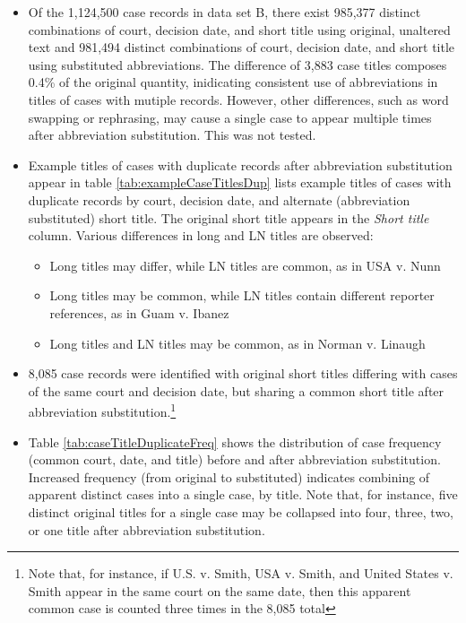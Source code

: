 \documentclass[10pt, letterpaper]{article}
\begin{document}
\begin{spacing}{1.0}
\begin{itemize}\setlength\itemsep{1pt}
    \item Of the 1,124,500 case records in data set B, there exist 985,377 distinct combinations of court, decision date, and short title using original, unaltered text and 981,494 distinct combinations of court, decision date, and short title using substituted abbreviations.  The difference of 3,883 case titles composes 0.4\% of the original quantity, inidicating consistent use of abbreviations in titles of cases with mutiple records.  However, other differences, such as word swapping or rephrasing, may cause a single case to appear multiple times after abbreviation substitution.  This was not tested.
    \item Example titles of cases with duplicate records after abbreviation substitution appear in table \ref{tab:exampleCaseTitlesDup} lists example titles of cases with duplicate records by court, decision date, and alternate (abbreviation substituted) short title.  The original short title appears in the \textit{Short title} column.  Various differences in long and LN titles are observed:
    \begin{itemize}[noitemsep]
        \item Long titles may differ, while LN titles are common, as in USA v. Nunn
        \item Long titles may be common, while LN titles contain different reporter references, as in Guam v. Ibanez
        \item Long titles and LN titles may be common, as in Norman v. Linaugh
    \end{itemize}
    \item 8,085 case records were identified with original short titles differing with cases of the same court and decision date, but sharing a common short title after abbreviation substitution.\footnote{Note that, for instance, if U.S. v. Smith, USA v. Smith, and United States v. Smith appear in the same court on the same date, then this apparent common case is counted three times in the 8,085 total}
    \item Table \ref{tab:caseTitleDuplicateFreq} shows the distribution of case frequency (common court, date, and title) before and after abbreviation substitution.  Increased frequency (from original to substituted) indicates combining of apparent distinct cases into a single case, by title.  Note that, for instance, five distinct original titles for a single case may be collapsed into four, three, two, or one title after abbreviation substitution.

\end{itemize}
\end{spacing}
\end{document}
